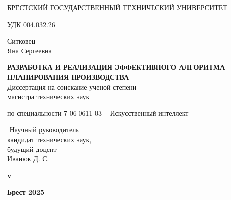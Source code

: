 \begin{titlepage}

    \begin{center} \bfseries
        \bigskip
        \medskip

        {БРЕСТСКИЙ ГОСУДАРСТВЕННЫЙ ТЕХНИЧЕСКИЙ УНИВЕРСИТЕТ}
    \end{center}
    \vspace{1cm}

    \noindent УДК 004.032.26 \\
    \vspace{1cm}

    \begin{center}
        {Ситковец \\ Яна Сергеевна}\\
        \vspace{1cm}

        {\bfseries РАЗРАБОТКА И РЕАЛИЗАЦИЯ ЭФФЕКТИВНОГО АЛГОРИТМА ПЛАНИРОВАНИЯ ПРОИЗВОДСТВА}\\
        \vspace{2cm}
        Диссертация на соискание ученой степени\\
        магистра технических наук\\
        \bigskip

        по специальности 7-06-0611-03 -- Искусственный интеллект
    \end{center}
    \vspace{3cm}

    \begin{tabbing}
        \hspace{8cm} \= \kill \>
        Научный руководитель \+ \\
        кандидат технических наук, \\будущий доцент\\
        Иванюк Д. С.
    \end{tabbing}


    \ifdefined\dissertationversion
        \vspace{3cm}
        \begin{center}
            \bfseries v\dissertationversion
        \end{center}
        \vspace{3cm}
    \else
        \vspace{5cm}
    \fi

    \begin{center}
        \bfseries Брест 2025
    \end{center}

\end{titlepage}
